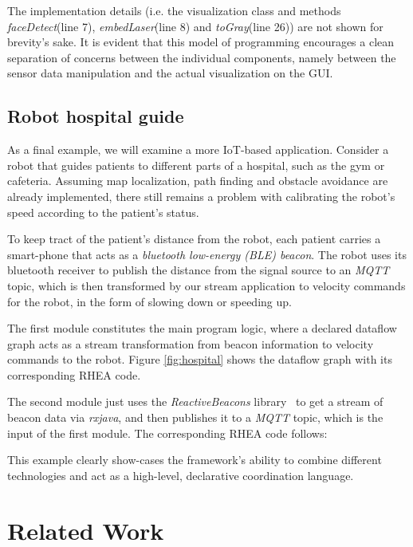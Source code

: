 \documentclass[sigplan,review,anonymous]{acmart}
\begin{document}
The implementation details (i.e. the visualization class and methods
\textit{faceDetect}(line 7), \textit{embedLaser}(line 8) and
\textit{toGray}(line 26)) are not shown for brevity's sake. It is evident that
this model of programming encourages a clean separation of concerns between the
individual components, namely between the sensor data manipulation and the
actual visualization on the GUI.

\subsection{Robot hospital guide}

As a final example, we will examine a more IoT-based application. Consider a
robot that guides patients to different parts of a hospital, such as the gym or
cafeteria. Assuming map localization, path finding and obstacle avoidance are
already implemented, there still remains a problem with calibrating the robot's
speed according to the patient's status.

To keep tract of the patient's distance from the robot, each patient carries a
smart-phone that acts as a \textit{bluetooth low-energy (BLE) beacon}. The robot
uses its bluetooth receiver to publish the distance from the signal source to an
\textit{MQTT} topic, which is then transformed by our stream application to
velocity commands for the robot, in the form of slowing down or speeding up.

The first module constitutes the main program logic, where a declared dataflow
graph acts as a stream transformation from beacon information to velocity
commands to the robot. Figure \ref{fig:hospital} shows the dataflow graph with
its corresponding \textsc{RHEA} code.


The second module just uses the \textit{ReactiveBeacons}
library~\cite{beacons} to get a stream of
beacon data via \textit{rxjava}, and then publishes it to a \textit{MQTT} topic,
which is the input of the first module. The corresponding \textsc{RHEA} code
follows:

This example clearly show-cases the framework's ability to combine different
technologies and act as a high-level, declarative coordination language.

\section{Related Work} \label{sec:related}
\end{document}

